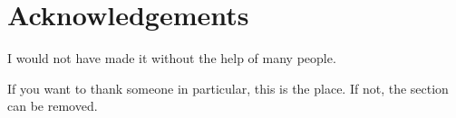 \chapter*{Acknowledgements}%
%
%
 
I would not have made it without the help of many people.

\medskip

If you want to thank someone in particular, this is the place. If not, the section can be removed.